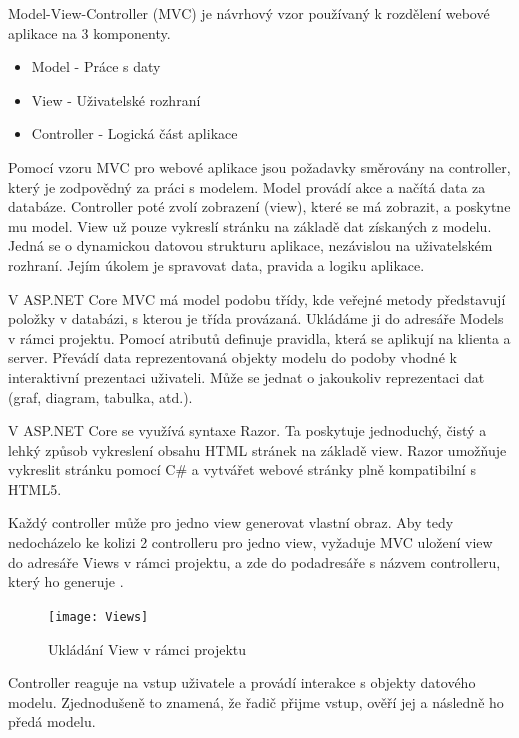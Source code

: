 \documentclass[a4paper, 12pt]{report}
\begin{document}
		Model-View-Controller (MVC) je návrhový vzor používaný k rozdělení webové aplikace na 3 komponenty.
		\begin{itemize}
			\item Model - Práce s daty
			\item View - Uživatelské rozhraní
			\item Controller - Logická část aplikace
		\end{itemize}\par
		Pomocí vzoru MVC pro webové aplikace jsou požadavky směrovány na controller, který je zodpovědný za práci s modelem. Model provádí akce a načítá data za databáze. Controller poté zvolí zobrazení (view), které se má zobrazit, a poskytne mu model. View už pouze vykreslí stránku na základě dat získaných z modelu.\cite{MVC}
				Jedná se o dynamickou datovou strukturu aplikace, nezávislou na uživatelském rozhraní. Jejím úkolem je spravovat data, pravida a logiku aplikace.\par
				V ASP.NET Core MVC má model podobu třídy, kde veřejné metody představují položky v databázi, s kterou je třída provázaná. Ukládáme ji do adresáře Models v rámci projektu. Pomocí atributů definuje pravidla, která se aplikují na klienta a server.\cite{MVC_Wiki_EN}
				Převádí data reprezentovaná objekty modelu do podoby vhodné k interaktivní prezentaci uživateli.\cite{MVC_Wiki_CZ} Může se jednat o jakoukoliv reprezentaci dat (graf, diagram, tabulka, atd.).\par
				V ASP.NET Core se využívá syntaxe Razor. Ta poskytuje jednoduchý, čistý a lehký způsob vykreslení obsahu HTML stránek na základě view. Razor umožňuje vykreslit stránku pomocí C\# a vytvářet webové stránky plně kompatibilní s HTML5.\cite{MVC_Wiki_EN}\par
				Každý controller může pro jedno view generovat vlastní obraz. Aby tedy nedocházelo ke kolizi 2 controlleru pro jedno view, vyžaduje  MVC uložení view do adresáře Views v rámci projektu, a zde do podadresáře s názvem controlleru, který ho generuje .
				\begin{figure}[H]
					\centering
					\texttt{[image: Views]}
					\caption{Ukládání View v rámci projektu}
					\label{Views}
				\end{figure}
				Controller reaguje na vstup uživatele a provádí interakce s objekty datového modelu. Zjednodušeně to znamená, že řadič přijme vstup, ověří jej a následně ho předá modelu.\cite{MVC_Wiki_EN}\par
\end{document}
